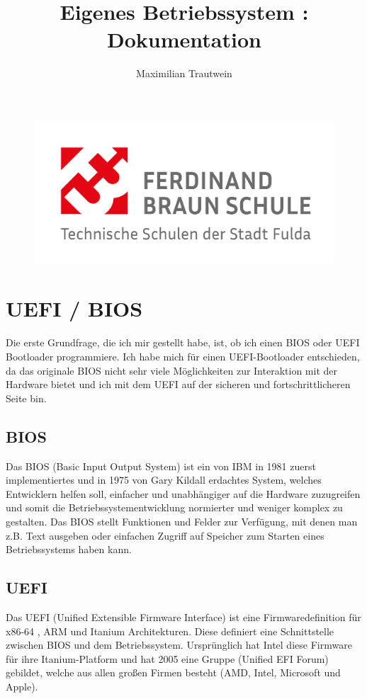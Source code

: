 \documentclass[12pt]{article}
\title{Eigenes Betriebssystem :  Dokumentation}
\author{Maximilian Trautwein}
\begin{document}
	
	\maketitle
	
	\begin{figure}[h]
		\centering
		\includegraphics[width=\textwidth]{FBS-Logo_2021-1}
	\end{figure}
	
	\newpage
	\tableofcontents
	
	\newpage
	
	\section{UEFI / BIOS}
	Die erste Grundfrage, die ich mir gestellt habe, ist, ob ich einen BIOS oder UEFI Bootloader programmiere. Ich habe mich für einen UEFI-Bootloader entschieden, da das originale BIOS nicht sehr viele Möglichkeiten zur Interaktion mit der Hardware bietet und ich mit dem UEFI auf der sicheren und fortschrittlicheren Seite bin. 
	\subsection{BIOS} 
 	Das BIOS (Basic Input Output System) ist ein von IBM in 1981 zuerst implementiertes und in 1975 von Gary Kildall erdachtes System, welches Entwicklern helfen soll, einfacher und unabhängiger auf die Hardware zuzugreifen und somit die Betriebssystementwicklung normierter und weniger komplex zu gestalten. Das BIOS stellt Funktionen und Felder zur Verfügung, mit denen man z.B. Text ausgeben oder einfachen Zugriff auf Speicher zum Starten eines Betriebssystems haben kann. 
 	\subsection{UEFI}
 	Das UEFI (Unified Extensible Firmware Interface) ist eine Firmwaredefinition für x86-64 , ARM und Itanium Architekturen. Diese definiert eine Schnittstelle zwischen BIOS und dem Betriebssystem. Ursprünglich hat Intel diese Firmware für ihre Itanium-Platform und hat 2005 eine Gruppe (Unified EFI Forum) gebildet, welche aus allen großen Firmen besteht (AMD, Intel, Microsoft und Apple).
	
\end{document}
